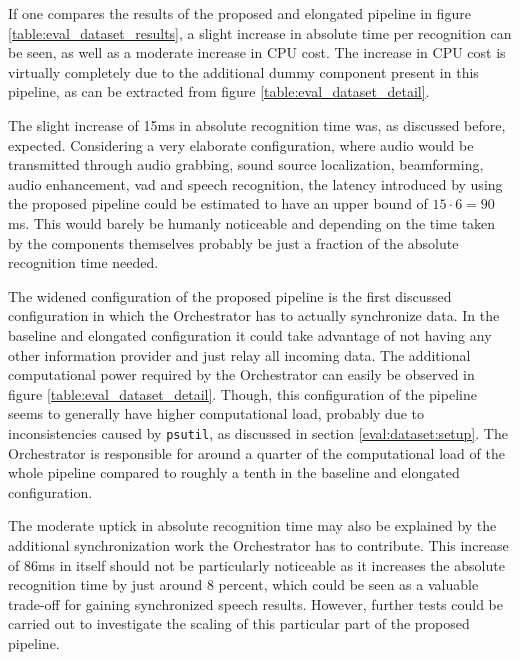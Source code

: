 
{ %
If one compares the results of the proposed and elongated pipeline in figure \ref{table:eval_dataset_results}, a slight increase in absolute time per recognition can be seen, as well as a moderate increase in CPU cost.
The increase in CPU cost is virtually completely due to the additional dummy component present in this pipeline, as can be extracted from figure \ref{table:eval_dataset_detail}. 

The slight increase of 15ms in absolute recognition time was, as discussed before, expected.
Considering a very elaborate configuration, where audio would be transmitted through audio grabbing, sound source localization, beamforming, audio enhancement, \gls{vad} and speech recognition, the latency introduced by using the proposed pipeline could be estimated to have an upper bound of $15\cdot6=90$ms.
This would barely be humanly noticeable and depending on the time taken by the components themselves probably be just a fraction of the absolute recognition time needed.
}

{ %
The widened configuration of the proposed pipeline is the first discussed configuration in which the Orchestrator has to actually synchronize data. 
In the baseline and elongated configuration it could take advantage of not having any other information provider and just relay all incoming data.
The additional computational power required by the Orchestrator can easily be observed in figure \ref{table:eval_dataset_detail}.
Though, this configuration of the pipeline seems to generally have higher computational load, probably due to inconsistencies caused by \texttt{psutil}, as discussed in section \ref{eval:dataset:setup}.
The Orchestrator is responsible for around a quarter of the computational load of the whole pipeline compared to roughly a tenth in the baseline and elongated configuration.

The moderate uptick in absolute recognition time may also be explained by the additional synchronization work the Orchestrator has to contribute. 
This increase of 86ms in itself should not be particularly noticeable as it increases the absolute recognition time by just around 8 percent, which could be seen as a valuable trade-off for gaining synchronized speech results. 
However, further tests could be carried out to investigate the scaling of this particular part of the proposed pipeline.
}

